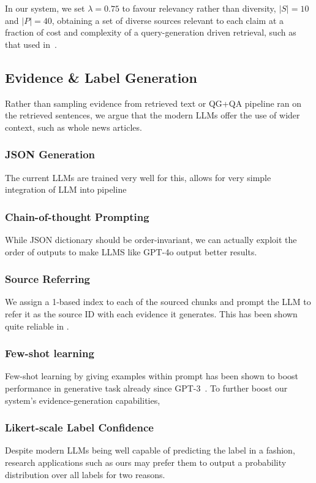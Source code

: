 In our system, we set $\lambda=0.75$ to favour relevancy rather than diversity, $|S|=10$ and $|P| = 40$, obtaining a set of diverse sources relevant to each claim at a fraction of cost and complexity of a query-generation driven retrieval, such as that used in~\cite{averitec2024}.

\subsection{Evidence \& Label Generation}
\label{sec:generation}
Rather than sampling evidence from retrieved text or QG+QA pipeline ran on the retrieved sentences, we argue that the modern LLMs offer the use of wider context, such as whole news articles.

\subsubsection{JSON Generation}
The current LLMs are trained very well for this, allows for very simple integration of LLM into pipeline

\subsubsection{Chain-of-thought Prompting}
While JSON dictionary should be order-invariant, we can actually exploit the order of outputs to make LLMS like GPT-4o output better results.~\cite{cot}

\subsubsection{Source Referring}
We assign a 1-based index to each of the sourced chunks and prompt the LLM to refer it as the source ID with each evidence it generates.
This has been shown quite reliable in .

\subsubsection{Few-shot learning}
Few-shot learning by giving examples within prompt has been shown to boost performance in generative task already since GPT-3~\cite{fewshot}.
To further boost our system's evidence-generation capabilities, 

\subsubsection{Likert-scale Label Confidence}
\label{likert}
Despite modern LLMs being well capable of predicting the label in a  fashion, research applications such as ours may prefer them to output a probability distribution over all labels for two reasons.

